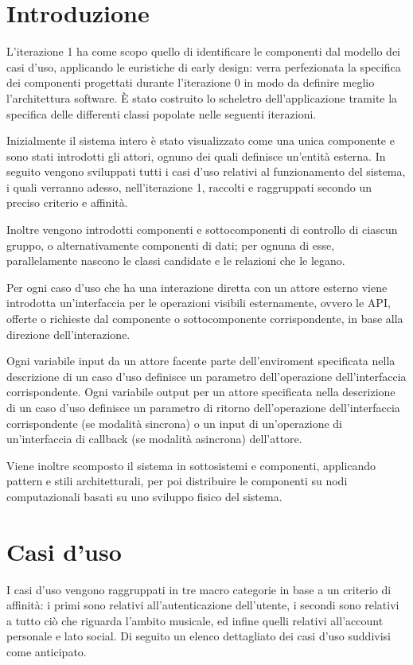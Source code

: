 \section{Introduzione}

L'iterazione 1 ha come scopo quello di identificare le componenti dal modello dei casi d'uso, applicando le euristiche di early design: 
verra perfezionata la specifica dei componenti progettati durante l'iterazione 0 in modo da definire meglio l'architettura software. 
È stato costruito lo scheletro dell'applicazione tramite la specifica delle differenti classi popolate nelle seguenti iterazioni.


Inizialmente il sistema intero è stato visualizzato come una unica componente e sono stati introdotti gli attori, ognuno dei quali 
definisce un'entità esterna. In seguito vengono sviluppati tutti i casi d'uso relativi al funzionamento del sistema, i quali verranno 
adesso, nell'iterazione 1, raccolti e raggruppati secondo un preciso criterio e affinità. 

Inoltre vengono introdotti componenti e sottocomponenti di controllo di ciascun gruppo, o alternativamente componenti di dati; 
per ognuna di esse, parallelamente nascono le classi candidate e le relazioni che le legano. 

Per ogni caso d'uso che ha una interazione diretta con un attore esterno viene introdotta un'interfaccia per le operazioni visibili 
esternamente, ovvero le API, offerte o richieste dal componente o sottocomponente corrispondente, in base alla direzione dell'interazione. 

Ogni variabile input da un attore facente parte dell'enviroment specificata nella descrizione di un caso d'uso definisce un parametro 
dell'operazione dell'interfaccia corrispondente. Ogni variabile output per un attore specificata nella descrizione di un caso d'uso 
definisce un parametro di ritorno dell'operazione dell'interfaccia corrispondente (se modalità sincrona) o un input di un'operazione 
di un'interfaccia di callback (se modalità asincrona) dell'attore. 

Viene inoltre scomposto il sistema in sottosistemi e componenti, applicando pattern e stili architetturali, per poi distribuire le 
componenti su nodi computazionali basati su uno sviluppo fisico del sistema.



\newpage
\section{Casi d'uso}
I casi d'uso vengono raggruppati in tre macro categorie in base a un criterio di affinità:
i primi sono relativi all'autenticazione dell'utente, i secondi sono relativi a tutto
ciò che riguarda l'ambito musicale, ed infine quelli relativi all'account personale e lato social. 
Di seguito un elenco dettagliato dei casi d'uso suddivisi come anticipato.


